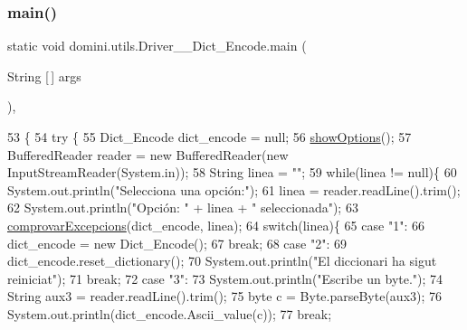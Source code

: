 \subsubsection{\texorpdfstring{main()}{main()}}
{\footnotesize\ttfamily static void domini.\+utils.\+Driver\+\_\+\+\_\+\+Dict\+\_\+\+Encode.\+main (\begin{DoxyParamCaption}\item[{String \mbox{[}$\,$\mbox{]}}]{args }\end{DoxyParamCaption})\hspace{0.3cm}{\ttfamily [inline]}, {\ttfamily [static]}}


\begin{DoxyCode}
53                                            \{
54     \textcolor{keywordflow}{try} \{
55         Dict\_Encode dict\_encode = null;
56         \hyperlink{classdomini_1_1utils_1_1Driver____Dict__Encode_a8b24c280193457c6620b2b5906018c34}{showOptions}();
57         BufferedReader reader = \textcolor{keyword}{new} BufferedReader(\textcolor{keyword}{new} InputStreamReader(System.in));
58         String linea = \textcolor{stringliteral}{""};
59         \textcolor{keywordflow}{while}(linea != null)\{
60             System.out.println(\textcolor{stringliteral}{"Selecciona una opción:"});
61             linea = reader.readLine().trim();
62             System.out.println(\textcolor{stringliteral}{"Opción: "} + linea + \textcolor{stringliteral}{" seleccionada"});
63             \hyperlink{classdomini_1_1utils_1_1Driver____Dict__Encode_ab67e87f26a75c12e50130a5e5facb52e}{comprovarExcepcions}(dict\_encode, linea);
64             \textcolor{keywordflow}{switch}(linea)\{
65                 \textcolor{keywordflow}{case} \textcolor{stringliteral}{"1"}:
66                     dict\_encode = \textcolor{keyword}{new} Dict\_Encode();
67                 \textcolor{keywordflow}{break};
68                 \textcolor{keywordflow}{case} \textcolor{stringliteral}{"2"}:
69                     dict\_encode.reset\_dictionary();
70                     System.out.println(\textcolor{stringliteral}{"El diccionari ha sigut reiniciat"});
71                 \textcolor{keywordflow}{break};
72                 \textcolor{keywordflow}{case} \textcolor{stringliteral}{"3"}:
73                     System.out.println(\textcolor{stringliteral}{"Escribe un byte."});
74                     String aux3 = reader.readLine().trim();
75                     byte c = Byte.parseByte(aux3);
76                     System.out.println(dict\_encode.Ascii\_value(c));
77                 \textcolor{keywordflow}{break};

\end{DoxyCode}
